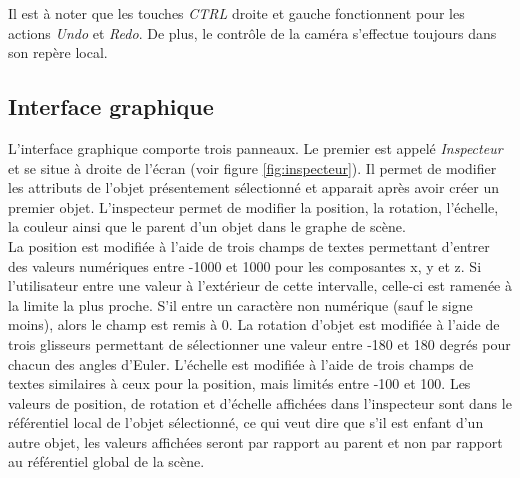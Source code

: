 Il est à noter que les touches \emph{CTRL} droite et gauche fonctionnent pour les actions \emph{Undo} et \emph{Redo}.
De plus, le contrôle de la caméra s'effectue toujours dans son repère local.\\

\subsection{Interface graphique}
L'interface graphique comporte trois panneaux.
Le premier est appelé \emph{Inspecteur} et se situe à droite de l'écran (voir figure \ref{fig:inspecteur}).
Il permet de modifier les attributs de l'objet présentement sélectionné et apparait après avoir créer un premier objet.
L'inspecteur permet de modifier la position, la rotation, l'échelle, la couleur ainsi que le parent d'un objet dans le graphe de scène.\\

La position est modifiée à l'aide de trois champs de textes permettant d'entrer des valeurs numériques entre -1000 et 1000 pour les composantes x, y et z.
Si l'utilisateur entre une valeur à l'extérieur de cette intervalle, celle-ci est ramenée à la limite la plus proche.
S'il entre un caractère non numérique (sauf le signe moins), alors le champ est remis à 0.
La rotation d'objet est modifiée à l'aide de trois glisseurs permettant de sélectionner une valeur entre -180 et 180 degrés pour chacun des angles d'Euler.
L'échelle est modifiée à l'aide de trois champs de textes similaires à ceux pour la position, mais limités entre -100 et 100. Les valeurs de position, de rotation et d'échelle affichées dans l'inspecteur sont dans le référentiel local de l'objet sélectionné, ce qui veut dire que s'il est enfant d'un autre objet, les valeurs affichées seront par rapport au parent et non par rapport au référentiel global de la scène.\\



